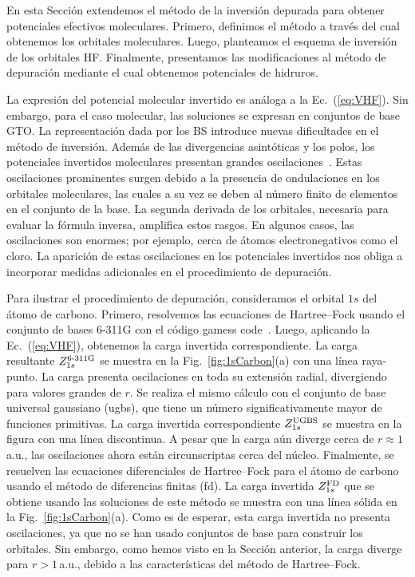 En esta Sección extendemos el método de la inversión depurada para 
obtener potenciales efectivos moleculares. Primero, definimos el método 
a través del cual obtenemos los orbitales moleculares. Luego, planteamos 
el esquema de inversión de los orbitales HF. Finalmente, presentamos las 
modificaciones al método de depuración mediante el cual obtenemos 
potenciales de hidruros.

La expresión del potencial molecular invertido es análoga a la 
Ec.~(\ref{eq:VHF}). Sin embargo, para el caso molecular, las soluciones 
se expresan en conjuntos de base GTO. 
%
La representación dada por los BS introduce nuevas dificultades en el 
método de inversión. Además de las divergencias asintóticas y los polos, 
los potenciales invertidos moleculares presentan grandes 
oscilaciones~\cite{Schipper:97,Mura:97,Jacob:11,Gaiduk:13}. Estas 
oscilaciones prominentes surgen debido a la presencia de ondulaciones en 
los orbitales moleculares, las cuales a su vez se deben al número finito 
de elementos en el conjunto de la base. La segunda derivada de los 
orbitales, necesaria para evaluar la fórmula inversa, amplifica estos 
rasgos. En algunos casos, las oscilaciones son enormes; por ejemplo, 
cerca de átomos electronegativos como el cloro. La aparición de estas 
oscilaciones en los potenciales invertidos nos obliga a incorporar 
medidas adicionales en el procedimiento de depuración.

Para ilustrar el procedimiento de depuración, consideramos el orbital 
$1s$ del átomo de carbono. Primero, resolvemos las ecuaciones de 
Hartree--Fock usando el conjunto de bases \mbox{6-311G} con el código 
{\sc gamess} code~\cite{Schmidt:93,Gordon:05}. Luego, aplicando la  
Ec.~(\ref{eq:VHF}), obtenemos la carga invertida correspondiente. La 
carga resultante $Z_{1s}^{\mbox{\scriptsize 6-311G}}$ se muestra en la 
Fig.~\ref{fig:1sCarbon}(a) con una línea raya-punto. La carga presenta 
oscilaciones en toda su extensión radial, divergiendo para valores 
grandes de $r$. Se realiza el mismo cálculo con el conjunto de base 
universal gaussiano (\acs{ugbs}), que tiene un número significativamente 
mayor de funciones primitivas. La carga invertida correspondiente 
$Z_{1s}^{\mbox{\scriptsize UGBS}}$ se muestra en la figura con una línea 
discontinua. A pesar que la carga aún diverge cerca de 
$r\approx1\,$a.u., las oscilaciones ahora están circunscriptas cerca del 
núcleo. Finalmente, se resuelven las ecuaciones diferenciales de 
Hartree--Fock para el átomo de carbono usando el método de diferencias 
finitas (\acs{fd}). La carga invertida $Z_{1s}^{\mbox{\scriptsize FD}}$ 
que se obtiene usando las soluciones de este método se muestra con una 
línea sólida en la Fig.~\ref{fig:1sCarbon}(a). Como es de esperar, esta 
carga invertida no presenta oscilaciones, ya que no se han usado 
conjuntos de base para construir los orbitales. Sin embargo, como hemos 
visto en la Sección anterior, la carga diverge para $r>1\,$a.u., debido 
a las características del método de Hartree--Fock. 

